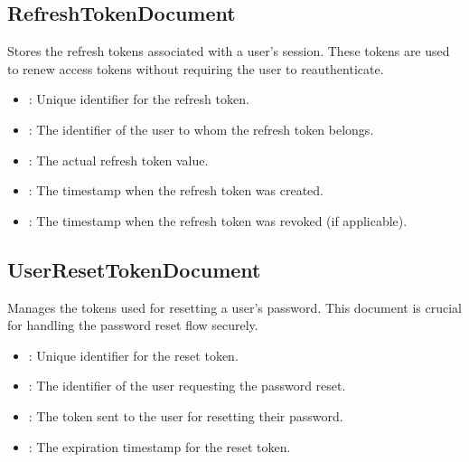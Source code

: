 \documentclass[letterpaper,10pt,english]{sphinxmanual}
\begin{document}
\subsection{RefreshTokenDocument}
\label{\detokenize{administration_concession_system/authorization_service:refreshtokendocument}}
\sphinxAtStartPar
Stores the refresh tokens associated with a user’s session. These tokens are used to renew access tokens without requiring the user to re\sphinxhyphen{}authenticate.
\begin{itemize}
\item {} 
\sphinxAtStartPar
{}: 
\sphinxhyphen{} Unique identifier for the refresh token.

\item {} 
\sphinxAtStartPar
{}: 
\sphinxhyphen{} The identifier of the user to whom the refresh token belongs.

\item {} 
\sphinxAtStartPar
{}: 
\sphinxhyphen{} The actual refresh token value.

\item {} 
\sphinxAtStartPar
{}: 
\sphinxhyphen{} The timestamp when the refresh token was created.

\item {} 
\sphinxAtStartPar
{}: 
\sphinxhyphen{} The timestamp when the refresh token was revoked (if applicable).

\end{itemize}


\subsection{UserResetTokenDocument}
\label{\detokenize{administration_concession_system/authorization_service:userresettokendocument}}
\sphinxAtStartPar
Manages the tokens used for resetting a user’s password. This document is crucial for handling the password reset flow securely.
\begin{itemize}
\item {} 
\sphinxAtStartPar
{}: 
\sphinxhyphen{} Unique identifier for the reset token.

\item {} 
\sphinxAtStartPar
{}: 
\sphinxhyphen{} The identifier of the user requesting the password reset.

\item {} 
\sphinxAtStartPar
{}: 
\sphinxhyphen{} The token sent to the user for resetting their password.

\item {} 
\sphinxAtStartPar
{}: 
\sphinxhyphen{} The expiration timestamp for the reset token.

\end{itemize}
\end{document}

